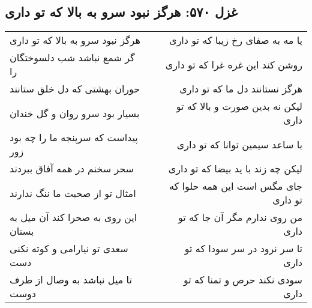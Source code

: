 \begin{center}
\section*{غزل ۵۷۰: هرگز نبود سرو به بالا که تو داری}
\label{sec:570}
\begin{longtable}{l p{0.5cm} r}
هرگز نبود سرو به بالا که تو داری
&&
یا مه به صفای رخ زیبا که تو داری
\\
گر شمع نباشد شب دلسوختگان را
&&
روشن کند این غره غرا که تو داری
\\
حوران بهشتی که دل خلق ستانند
&&
هرگز نستانند دل ما که تو داری
\\
بسیار بود سرو روان و گل خندان
&&
لیکن نه بدین صورت و بالا که تو داری
\\
پیداست که سرپنجه ما را چه بود زور
&&
با ساعد سیمین توانا که تو داری
\\
سحر سخنم در همه آفاق ببردند
&&
لیکن چه زند با ید بیضا که تو داری
\\
امثال تو از صحبت ما ننگ ندارند
&&
جای مگس است این همه حلوا که تو داری
\\
این روی به صحرا کند آن میل به بستان
&&
من روی ندارم مگر آن جا که تو داری
\\
سعدی تو نیارامی و کوته نکنی دست
&&
تا سر نرود در سر سودا که تو داری
\\
تا میل نباشد به وصال از طرف دوست
&&
سودی نکند حرص و تمنا که تو داری
\\
\end{longtable}
\end{center}
